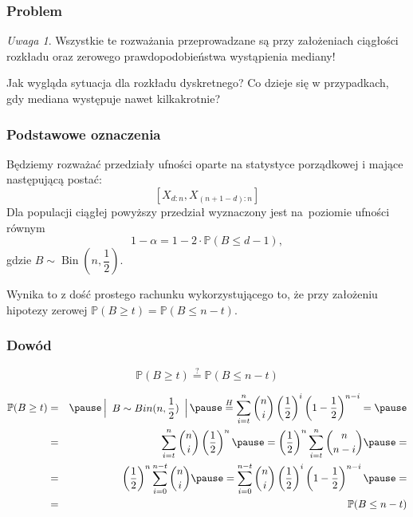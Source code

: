 \documentclass[11pt,usenames,dvipsnames,svgnames,x11names]{beamer}
\theoremstyle{plain}
\theoremstyle{definition}
\theoremstyle{remark}
\newtheorem{uwaga}{Uwaga}
\begin{document}
\begin{frame}
\frametitle{Problem}
\begin{uwaga}
Wszystkie te rozważania przeprowadzane są przy założeniach ciągłości rozkładu oraz zerowego prawdopodobieństwa wystąpienia mediany!
\end{uwaga}
\vspace{1.2cm}
Jak wygląda sytuacja dla rozkładu dyskretnego? Co dzieje się w przypadkach, gdy mediana występuje nawet kilkakrotnie? 
\end{frame}

\begin{frame}
\frametitle{Podstawowe oznaczenia}
Będziemy rozważać przedziały ufności oparte na statystyce porządkowej i mające następującą postać:
$$
[X_{d:n},X_{(n+1-d):n}]
$$
Dla populacji ciągłej powyższy przedział wyznaczony jest na~poziomie ufności równym
$$
1-\alpha = 1-2\cdot\mathbb{P}(B \leq d-1),
$$   
gdzie $B\sim\operatorname{Bin}(n,\dfrac{1}{2})$. 

\bigskip

Wynika to z dość prostego rachunku wykorzystującego to, że przy założeniu hipotezy zerowej $\mathbb{P}(B\geq t)=\mathbb{P}(B\leq n-t)$.
\end{frame}

\begin{frame}
\frametitle{Dowód}
$$\mathbb{P}(B\geq t)\stackrel{?}{=}\mathbb{P}(B\leq n-t)$$

\begin{eqnarray*}
\mathbb{P}(B\geq t)&=&\pause \left| \begin{array}{c}{\nonumber B\sim Bin(n,\dfrac{1}{2})}\end{array} \right| \pause \stackrel{H}{=} \sum_{i=t}^n {n \choose i} \left(\dfrac{1}{2}\right)^i\left(1-\dfrac{1}{2}\right)^{n-i}=\pause  \\&=&\sum_{i=t}^n {n \choose i} \left(\dfrac{1}{2}\right)^n\pause =\left(\dfrac{1}{2}\right)^n \sum_{i=t}^n {n \choose n-i}\pause=\\&=&\left(\dfrac{1}{2}\right)^n \sum_{i=0}^{n-t} {n \choose i}\pause =\sum_{i=0}^{n-t} {n \choose i} \left(\dfrac{1}{2}\right)^i\left(1-\dfrac{1}{2}\right)^{n-i}\pause =\\ &=&\mathbb{P}(B\leq n-t)
\end{eqnarray*}
\end{frame}
\end{document}
